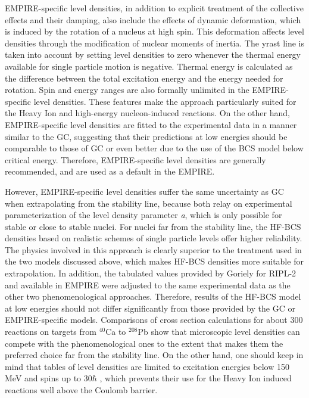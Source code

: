 \documentclass[twocolumn,amsmath,amssymb,10pt,groupedaddress,a4paper]{revtex4}
\begin{document}
EMPIRE-specific level densities, in addition to explicit treatment of the collective effects and their damping, also include the effects of dynamic deformation, which is induced by the rotation of a nucleus at high spin. This deformation affects level densities through the modification of nuclear moments of inertia. The yrast line is taken into account by setting level densities to zero whenever the thermal energy available for single particle motion is negative. Thermal energy is calculated as the difference between the total excitation energy and the energy needed for rotation. Spin and energy ranges are also formally unlimited in the EMPIRE-specific level densities. These features make the approach particularly suited for the Heavy Ion and high-energy nucleon-induced reactions. On the other hand, EMPIRE-specific level densities are fitted to the experimental data in a manner similar to the GC, suggesting that their predictions at low energies should be comparable to those of GC or even better due to the use of the BCS model below critical energy. Therefore, EMPIRE-specific level densities are generally recommended, and are used as a default in the EMPIRE.

However, EMPIRE-specific level densities suffer the same uncertainty as GC when extrapolating from the stability line, because both relay on experimental parameterization of the level density parameter \textit{a}, which is only possible for stable or close to stable nuclei. For nuclei far from the stability line, the HF-BCS densities based on realistic schemes of single particle levels offer higher reliability. The physics involved in this approach is clearly superior to the treatment used in the two models discussed above, which makes HF-BCS densities more suitable for extrapolation. In addition, the tabulated values provided by Goriely for RIPL-2 and available in EMPIRE were adjusted to the same experimental data as the other two phenomenological approaches. Therefore, results of the HF-BCS model at low energies should not differ significantly from those provided by the GC or EMPIRE-specific models. Comparisons of cross section calculations for about 300 reactions on targets from $^{40}$Ca to $^{208}$Pb show that microscopic level densities can compete with the phenomenological ones to the extent that makes them the preferred choice far from the stability line. On the other hand, one should keep in mind that tables of level densities are limited to excitation energies below 150 MeV and spins up to 30$\hbar$ , which prevents their use for the Heavy Ion induced reactions well above the Coulomb barrier.
\end{document}
